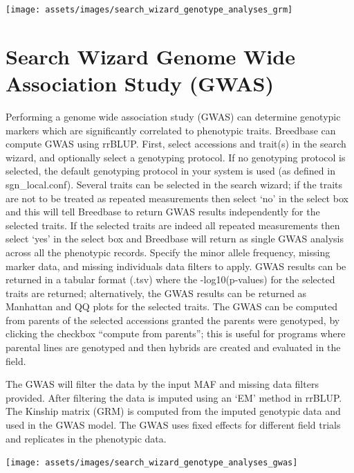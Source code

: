 \documentclass[
  12pt,
]{book}
\begin{document}
\begin{center}\texttt{[image: assets/images/search\_wizard\_genotype\_analyses\_grm]} \end{center}

\hypertarget{search-wizard-genome-wide-association-study-gwas}{%
\section{Search Wizard Genome Wide Association Study (GWAS)}\label{search-wizard-genome-wide-association-study-gwas}}

Performing a genome wide association study (GWAS) can determine genotypic markers which are significantly correlated to phenotypic traits. Breedbase can compute GWAS using rrBLUP. First, select accessions and trait(s) in the search wizard, and optionally select a genotyping protocol. If no genotyping protocol is selected, the default genotyping protocol in your system is used (as defined in sgn\_local.conf). Several traits can be selected in the search wizard; if the traits are not to be treated as repeated measurements then select `no' in the select box and this will tell Breedbase to return GWAS results independently for the selected traits. If the selected traits are indeed all repeated measurements then select `yes' in the select box and Breedbase will return as single GWAS analysis across all the phenotypic records. Specify the minor allele frequency, missing marker data, and missing individuals data filters to apply. GWAS results can be returned in a tabular format (.tsv) where the -log10(p-values) for the selected traits are returned; alternatively, the GWAS results can be returned as Manhattan and QQ plots for the selected traits. The GWAS can be computed from parents of the selected accessions granted the parents were genotyped, by clicking the checkbox ``compute from parents''; this is useful for programs where parental lines are genotyped and then hybrids are created and evaluated in the field.

The GWAS will filter the data by the input MAF and missing data filters provided. After filtering the data is imputed using an `EM' method in rrBLUP. The Kinship matrix (GRM) is computed from the imputed genotypic data and used in the GWAS model. The GWAS uses fixed effects for different field trials and replicates in the phenotypic data.

\begin{center}\texttt{[image: assets/images/search\_wizard\_genotype\_analyses\_gwas]} \end{center}
\end{document}
